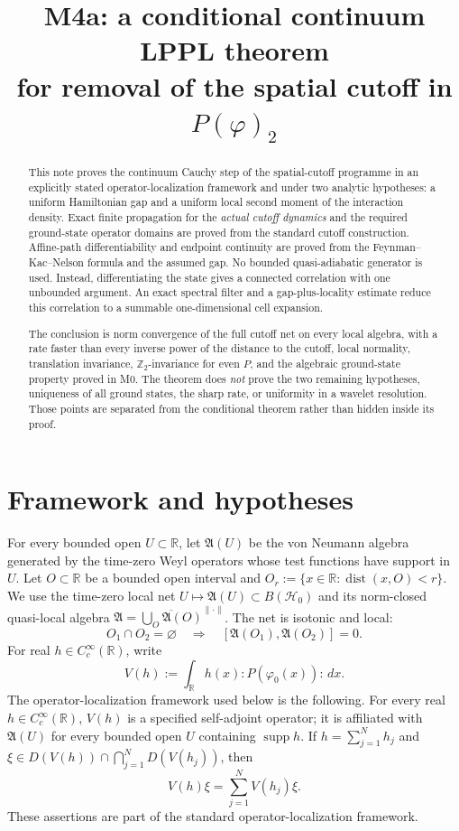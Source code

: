 \documentclass[11pt,a4paper]{article}
\title{M4a: a conditional continuum LPPL theorem\\
for removal of the spatial cutoff in $P(\varphi)_2$}
\author{}
\date{}
\theoremstyle{remark}
\newcommand{\R}{\mathbb R}
\newcommand{\A}{\mathfrak A}
\newcommand{\Hh}{\mathcal H_0}
\DeclareMathOperator{\supp}{supp}
\DeclareMathOperator{\dist}{dist}
\begin{document}
\maketitle

\begin{abstract}
This note proves the continuum Cauchy step of the spatial-cutoff programme in an explicitly stated
operator-localization framework and under two analytic hypotheses: a uniform Hamiltonian gap and
a uniform local second moment of the interaction density.  Exact finite propagation for the
\emph{actual cutoff dynamics} and the required ground-state operator domains are proved from the
standard cutoff construction.  Affine-path differentiability and endpoint continuity are proved
from the Feynman--Kac--Nelson formula and the assumed gap.  No bounded quasi-adiabatic generator is
used.
Instead, differentiating the state gives a connected correlation with one unbounded argument.
An exact spectral filter and a gap-plus-locality estimate reduce this correlation to a summable
one-dimensional cell expansion.

The conclusion is norm convergence of the full cutoff net on every local algebra, with a rate
faster than every inverse power of the distance to the cutoff, local normality, translation
invariance, $\mathbb Z_2$-invariance for even $P$, and the algebraic ground-state property proved
in M0.  The theorem does \emph{not} prove the two remaining hypotheses, uniqueness of all ground states,
the sharp rate, or uniformity in a wavelet resolution.  Those points are separated from the
conditional theorem rather than hidden inside its proof.
\end{abstract}

\section{Framework and hypotheses}\label{sec:framework}

For every bounded open $U\subset\R$, let $\A(U)$ be the von Neumann algebra generated by the
time-zero Weyl operators whose test functions have support in $U$.  Let $O\subset\R$ be a bounded
open interval and $O_r:=\{x\in\R:\dist(x,O)<r\}$.  We use the time-zero local net
$U\mapsto\A(U)\subset B(\Hh)$ and its norm-closed quasi-local algebra
$\A=\overline{\bigcup_O\A(O)}^{\|\cdot\|}$.  The net is isotonic and local:
\[
 O_1\cap O_2=\varnothing\quad\Longrightarrow\quad
 [\A(O_1),\A(O_2)]=0.
\]
For real $h\in C_c^\infty(\R)$, write
\[
 V(h):=\int_{\R}h(x):P(\varphi_0(x)):\,dx .
\]
The operator-localization framework used below is the following.  For every real
$h\in C_c^\infty(\R)$, $V(h)$ is a specified self-adjoint operator; it is affiliated with $\A(U)$
for every bounded open $U$ containing $\supp h$.  If $h=\sum_{j=1}^N h_j$ and
$\xi\in D(V(h))\cap\bigcap_{j=1}^ND(V(h_j))$, then
\[
 V(h)\xi=\sum_{j=1}^N V(h_j)\xi.
\]
These assertions are part of the standard operator-localization framework.
\end{document}
